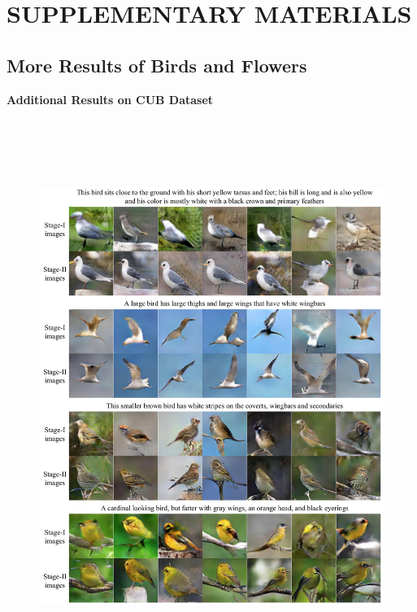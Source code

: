 \documentclass[a4paper,12pt,oneside]{article}
\begin{document}
\newpage
\section{SUPPLEMENTARY MATERIALS}
\subsection{More Results of Birds and Flowers}
\textbf{Additional Results on CUB Dataset}

\begin{figure}[H]
  \centering
  \includegraphics[height=18cm,width=15cm]{Figure9.png}
  \end{figure}
\end{document}
